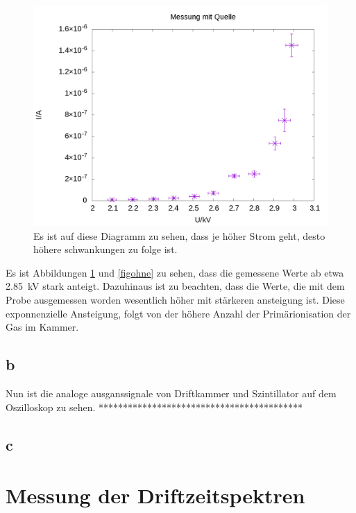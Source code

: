 \documentclass[12pt,ngerman]{article}
\begin{document}
\begin{figure}[htbp]
	\centering
	\includegraphics[width=0.45\textheight]{mit.png}
	\caption{ Es ist auf diese Diagramm zu sehen, dass je höher Strom geht, desto höhere schwankungen zu folge ist.}
	\label{figmit}
\end{figure}
Es ist Abbildungen \ref{figmit} und \ref{figohne} zu sehen, dass die gemessene Werte ab etwa \SI{2.85}{\kilo\volt} stark anteigt. Dazuhinaus ist zu beachten, dass die Werte, die mit dem Probe ausgemessen worden wesentlich höher mit stärkeren ansteigung ist. Diese exponnenzielle Ansteigung, folgt von der höhere Anzahl der Primärionisation der Gas im Kammer.
\subsection{b}
Nun ist die analoge ausganssignale von Driftkammer und Szintillator auf dem Oszilloskop zu sehen.
******************************************
\subsection{c} 
\section{Messung der Driftzeitspektren}
\end{document}

